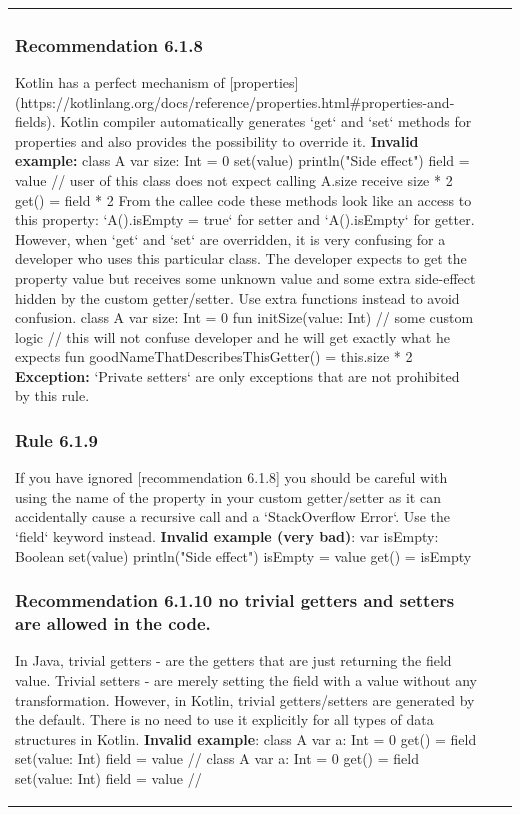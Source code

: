 \begin{center}
\begin{tabular}{ |p{}|p{}|p{}| }
{{{{{\subsubsection*{\textbf{Recommendation 6.1.8}}
Kotlin has a perfect mechanism of [properties](https://kotlinlang.org/docs/reference/properties.html\#properties-and-fields).
Kotlin compiler automatically generates `get` and `set` methods for properties and also provides the possibility to override it.
\textbf{Invalid example:}
class A {
    var size: Int = 0
        set(value) {
            println("Side effect")
            field = value
        }
        // user of this class does not expect calling A.size receive size * 2
        get() = field * 2
}
From the callee code these methods look like an access to this property: `A().isEmpty = true` for setter and `A().isEmpty` for getter.
However, when `get` and `set` are overridden, it is very confusing for a developer who uses this particular class.
The developer expects to get the property value but receives some unknown value and some extra side-effect hidden by the custom getter/setter.
Use extra functions instead to avoid confusion.
class A {
    var size: Int = 0
    fun initSize(value: Int) {
        // some custom logic
    }
    // this will not confuse developer and he will get exactly what he expects
    fun goodNameThatDescribesThisGetter() = this.size * 2
}
\textbf{Exception:} `Private setters` are only exceptions that are not prohibited by this rule.
\subsubsection*{\textbf{Rule 6.1.9}}
If you have ignored [recommendation 6.1.8] you should be careful with using the name of the property in your custom getter/setter
as it can accidentally cause a recursive call and a `StackOverflow Error`. Use the `field` keyword instead.
\textbf{Invalid example (very bad)}:
var isEmpty: Boolean
    set(value) {
        println("Side effect")
        isEmpty = value
    }
    get() = isEmpty
\subsubsection*{\textbf{Recommendation 6.1.10 no trivial getters and setters are allowed in the code.}}
In Java, trivial getters - are the getters that are just returning the field value.
Trivial setters - are merely setting the field with a value without any transformation.
However, in Kotlin, trivial getters/setters are generated by the default. There is no need to use it explicitly for all types of data structures in Kotlin.
\textbf{Invalid example}:
class A {
    var a: Int = 0
    get() = field
    set(value: Int) { field = value }
    //
}
class A {
    var a: Int = 0
    get() = field
    set(value: Int) { field = value }
    //
}
}}}}}
\end{tabular}
\end{center}
